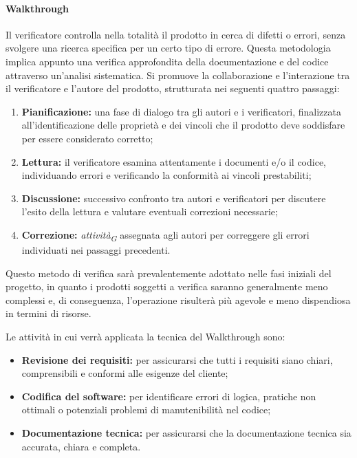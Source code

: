 \paragraph{Walkthrough}
Il verificatore controlla nella totalità il prodotto in cerca di difetti o errori, senza svolgere una ricerca specifica per un certo tipo di errore. Questa metodologia implica appunto una verifica approfondita della documentazione e del codice attraverso un'analisi sistematica. Si promuove la collaborazione e l'interazione tra il verificatore e l'autore del prodotto, strutturata nei seguenti quattro passaggi:

\begin{enumerate}
    \item \textbf{Pianificazione:} 
        una fase di dialogo tra gli autori e i verificatori, finalizzata all'identificazione delle proprietà e dei vincoli che il prodotto deve soddisfare per essere considerato corretto; 

    \item \textbf{Lettura:} 
        il verificatore esamina attentamente i documenti e/o il codice, individuando errori e verificando la conformità ai vincoli prestabiliti; 

    \item \textbf{Discussione:} 
        successivo confronto tra autori e verificatori per discutere l'esito della lettura e valutare eventuali correzioni necessarie; 

    \item \textbf{Correzione:} 
        \textit{attività}\textsubscript{\textit{G}} assegnata agli autori per correggere gli errori individuati nei passaggi precedenti.
\end{enumerate}

Questo metodo di verifica sarà prevalentemente adottato nelle fasi iniziali del progetto, in quanto i prodotti soggetti a verifica saranno generalmente meno complessi e, di conseguenza, l'operazione risulterà più agevole e meno dispendiosa in termini di risorse.

Le attività in cui verrà applicata la tecnica del Walkthrough sono:
\begin{itemize}
    \item \textbf{Revisione dei requisiti:} 
        per assicurarsi che tutti i requisiti siano chiari, comprensibili e conformi alle esigenze del cliente;
    \item \textbf{Codifica del software:} 
        per identificare errori di logica, pratiche non ottimali o potenziali problemi di manutenibilità nel codice;
    \item \textbf{Documentazione tecnica:} 
        per assicurarsi che la documentazione tecnica sia accurata, chiara e completa. 
\end{itemize}

